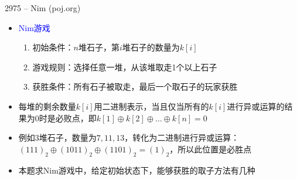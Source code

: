 \begin{frame}{2975 -- Nim (poj.org)}
    \begin{itemize}
        \item \textcolor{blue}{Nim游戏}
        \begin{enumerate}[(1)]
            \item 初始条件：$n$堆石子，第$i$堆石子的数量为$k[i]$
            \item 游戏规则：选择任意一堆，从该堆取走1个以上石子
            \item 获胜条件：所有石子被取走，最后一个取石子的玩家获胜
        \end{enumerate}
        \item 每堆的剩余数量$k[i]$用二进制表示，当且仅当所有的$k[i]$进行异或运算的结果为0时是必败点，即$k[1]\oplus k[2]\oplus \ldots \oplus k[n]=0$
        \item 例如3堆石子，数量为$7,11,13$，转化为二进制进行异或运算：$(111)_2\oplus (1011)_2\oplus (1101)_2=(1)_2$，所以此位置是必胜点
        \item 本题求Nim游戏中，给定初始状态下，能够获胜的取子方法有几种   
    \end{itemize}
\end{frame}
